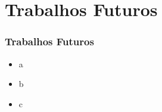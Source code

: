 \section{Trabalhos Futuros}

\begin{frame}
	\frametitle{Trabalhos Futuros}
	\begin{itemize}
		\item a
		\item b
		\item c
	\end{itemize}
\end{frame}
